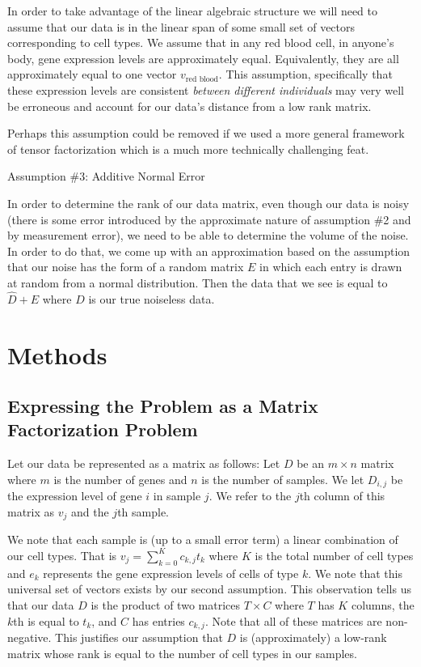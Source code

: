 \documentclass[10pt]{article}
\begin{document}
In order to take advantage of the linear algebraic structure we will need to assume that our data is in the linear span of some small set of vectors corresponding to cell types.
We assume that in any red blood cell, in anyone's body, gene expression levels are approximately equal.
Equivalently, they are all approximately equal to one vector \(v_{\text{red blood}}\).
This assumption, specifically that these expression levels are consistent \emph{between different individuals} may very well be erroneous and account for our data's distance from a low rank matrix.

Perhaps this assumption could be removed if we used a more general framework of tensor factorization which is a much more technically challenging feat.

\begin{center}
Assumption \#3: Additive Normal Error
\end{center}

In order to determine the rank of our data matrix, even though our data is noisy (there is some error introduced by the approximate nature of assumption \#2 and by measurement error), we need to be able to determine the volume of the noise.
In order to do that, we come up with an approximation based on the assumption that our noise has the form of a random matrix \(E\) in which each entry is drawn at random from a normal distribution.
Then the data that we see is equal to \(\hat{D} + E\) where \(\hat{D}\) is our true noiseless data.

\section{Methods}

\subsection{Expressing the Problem as a Matrix Factorization Problem}
Let our data be represented as a matrix as follows:
Let \(D\) be an \(m \times n\) matrix where \(m\) is the number of genes and \(n\) is the number of samples.
We let \(D_{i, j}\) be the expression level of gene \(i\) in sample \(j\).
We refer to the \(j\)th column of this matrix as \(v_j\) and the \(j\)th sample.

We note that each sample is (up to a small error term) a linear combination of our cell types.
That is \(v_j = \sum_{k=0}^Kc_{k, j}t_k\) where \(K\) is the total number of cell types and \(e_k\) represents the gene expression levels of cells of type \(k\).
We note that this universal set of vectors exists by our second assumption.
This observation tells us that our data \(D\) is the product of two matrices \(T \times C\) where \(T\) has \(K\) columns, the \(k\)th is equal to \(t_k\), and \(C\) has entries \(c_{k, j}\).
Note that all of these matrices are non-negative.
This justifies our assumption that \(D\) is (approximately) a low-rank matrix whose rank is equal to the number of cell types in our samples.
\end{document}
